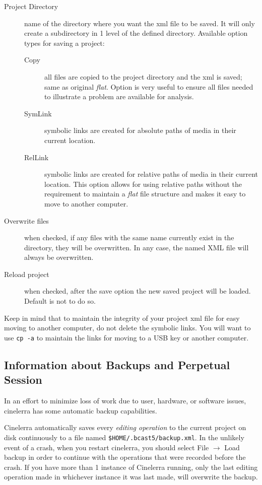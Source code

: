 \begin{description}
    \item[Project Directory] name of the directory where you want the xml file to be saved.  It will only create
    a subdirectory in 1 level of the defined directory.
    Available option types for saving a project:
    \begin{description}
        \item[Copy] all files are copied to the project directory and the xml is saved; same as original \textit{flat}.
        Option is very useful to ensure all files needed to illustrate a problem are available for analysis.
        \item[SymLink] symbolic links are created for absolute paths of media in their current location.
        \item[RelLink] symbolic links are created for relative paths of media in their current location.  This
        option allows for using relative paths without the requirement to maintain a \textit{flat} file structure
        and makes it easy to move to another computer.
    \end{description}
    \item[Overwrite files] when checked, if any files with the same name currently exist in the directory, they
    will be overwritten.  In any case, the named XML file will always be overwritten.
    \item[Reload project] when checked, after the save option the new saved project will be loaded. Default is not to do so.
\end{description}

\noindent Keep in mind that to maintain the integrity of your project xml file for easy moving to another computer, do not delete the symbolic links.  You will want to use \texttt{cp\,-a} to maintain the links for moving to a USB key or another computer.

\subsection{Information about Backups and Perpetual Session}%
\label{sub:information_backups_perpetual_session}

In an effort to minimize loss of work due to user, hardware, or software issues, cinelerra has some automatic backup capabilities.

Cinelerra automatically saves every \textit{editing operation} to the current project on disk continuously to a file named \texttt{\$HOME/.bcast5/backup.xml}.  In the unlikely event of a crash, when you restart cinelerra, you should select File $\rightarrow$ Load backup in order to continue with the operations that were recorded before the crash.  If you have more than 1 instance of Cinelerra running, only the last editing operation made in whichever instance it was last made, will overwrite the backup. 

